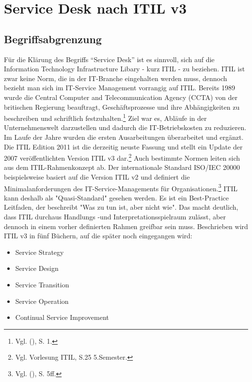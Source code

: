 \section{Service Desk nach ITIL v3}

\subsection{Begriffsabgrenzung}

\noindent Für die Klärung des Begriffs \enquote{Service Desk} ist es sinnvoll, sich auf die Information Technology Infrastructure Libary - kurz ITIL - zu beziehen.
ITIL ist zwar keine Norm, die in der IT-Branche eingehalten werden muss, dennoch bezieht man sich im IT-Service Management vorrangig auf ITIL.
Bereits 1989 wurde die Central Computer and Telecommunication Agency (CCTA) von der britischen Regierung beauftragt, Geschäftsprozesse und ihre Abhängigkeiten zu beschreiben und schriftlich festzuhalten.\footnote{Vgl. \citeauthor{Olbrich} (\citeyear{Olbrich}), S. 1.}
Ziel war es, Abläufe in der Unternehmenswelt darzustellen und dadurch die IT-Betriebskosten zu reduzieren. Im Laufe der Jahre wurden die ersten Ausarbeitungen überarbeitet und ergänzt. Die ITIL Edition 2011 ist die derzeitig neuste Fassung und stellt ein Update der 2007 veröffentlichten Version ITIL v3 dar.\footnote{Vgl. Vorlesung ITIL, S.25 5.Semester.}
Auch bestimmte Normen leiten sich aus dem ITIL-Rahmenkonzept ab. Der internationale Standard ISO/IEC 20000 beispielsweise basiert auf die Version ITIL v2 und definiert die Minimalanforderungen des IT-Service-Managements für Organisationen.\footnote{Vgl. \citeauthor{Buchsein} (\citeyear{Buchsein}), S. 5ff.}
ITIL kann deshalb als "Quasi-Standard" gesehen werden. Es ist ein  Best-Practice Leitfaden, der beschreibt "Was zu tun ist, aber nicht wie". Das macht deutlich, dass ITIL durchaus Handlungs -und Interpretationsspielraum zulässt, aber dennoch in einem vorher definierten Rahmen greifbar sein muss. Beschrieben wird ITIL v3 in fünf Büchern, auf die später noch eingegangen wird:

\begin{itemize}
\item Service Strategy
\item Service Design
\item Service Transition
\item Service Operation
\item Continual Service Improvement
\end{itemize}

